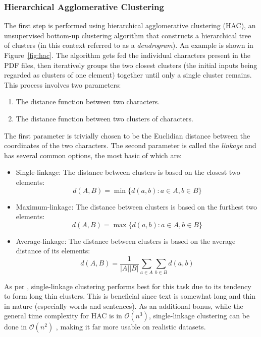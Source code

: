 \subsubsection{Hierarchical Agglomerative Clustering}
The first step is performed using hierarchical agglomerative clustering (HAC),
an unsupervised bottom-up clustering algorithm that constructs a hierarchical
tree of clusters (in this context referred to as a \emph{dendrogram}). An
example is shown in Figure~\ref{fig:hac}. The algorithm gets fed the individual
characters present in the PDF files, then iteratively groups the two closest
clusters (the initial inputs being regarded as clusters of one element) together
until only a single cluster remains. This process involves two parameters:
\begin{enumerate}
\item The distance function between two characters.
\item The distance function between two clusters of characters.
\end{enumerate}
The first parameter is trivially chosen to be the Euclidian distance between the
coordinates of the two characters. The second parameter is called the
\emph{linkage} and has several common options, the most basic of which are:
\begin{itemize}
\item Single-linkage: The distance between clusters is based on the closest two
  elements: \[ d(A, B) = \min \{ d(a, b) : a \in A, b \in B \} \]
\item Maximum-linkage: The distance between clusters is based on the furthest two
  elements: \[ d(A, B) = \max \{ d(a, b) : a \in A, b \in B \} \]
\item Average-linkage: The distance between clusters is based on the average
  distance of its elements:
  \[ d(A, B) = \frac{1}{|A||B|} \sum_{a \in A}\sum_{b \in B} d(a, b) \]
\end{itemize}
As per \textcite{klampfl2014unsupervised}, single-linkage clustering performs
best for this task due to its tendency to form long thin clusters. This is
beneficial since text is somewhat long and thin in nature (especially words and
sentences). As an additional bonus, while the general time complexity for HAC is
in $\mathcal{O}(n^3)$, single-linkage clustering can be done in
$\mathcal{O}(n^2)$ \citep{sibson1973slink}, making it far more usable on
realistic datasets.

